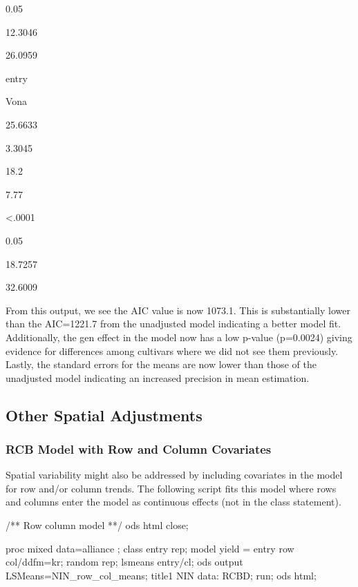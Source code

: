 \documentclass[
]{book}
\newenvironment{Shaded}{\begin{snugshade}}{\end{snugshade}}
\newcommand{\NormalTok}[1]{#1}
\begin{document}
0.05

12.3046

26.0959

entry

Vona

25.6633

3.3045

18.2

7.77

\textless.0001

0.05

18.7257

32.6009

From this output, we see the AIC value is now 1073.1. This is substantially lower than the AIC=1221.7 from the unadjusted model indicating a better model fit. Additionally, the gen effect in the model now has a low p-value (p=0.0024) giving evidence for differences among cultivars where we did not see them previously. Lastly, the standard errors for the means are now lower than those of the unadjusted model indicating an increased precision in mean estimation.

\hypertarget{other-spatial-adjustments}{%
\subsection{Other Spatial Adjustments}\label{other-spatial-adjustments}}

\hypertarget{rcb-model-with-row-and-column-covariates}{%
\subsubsection{RCB Model with Row and Column Covariates}\label{rcb-model-with-row-and-column-covariates}}

Spatial variability might also be addressed by including covariates in the model for row and/or column trends. The following script fits this model where rows and columns enter the model as continuous effects (not in the class statement).

\begin{Shaded}
\begin{Highlighting}[]

\NormalTok{/** Row column model **/}
\NormalTok{ods html close;}

\NormalTok{proc mixed data=alliance ;}
\NormalTok{    class entry rep;}
\NormalTok{    model yield = entry  row col/ddfm=kr;}
\NormalTok{    random rep;}
\NormalTok{    lsmeans entry/cl;}
\NormalTok{    ods output LSMeans=NIN\_row\_col\_means;}
\NormalTok{    title1 \textquotesingle{}NIN data: RCBD\textquotesingle{};}
\NormalTok{run;}
\NormalTok{ods html;}
\end{Highlighting}
\end{Shaded}
\end{document}
